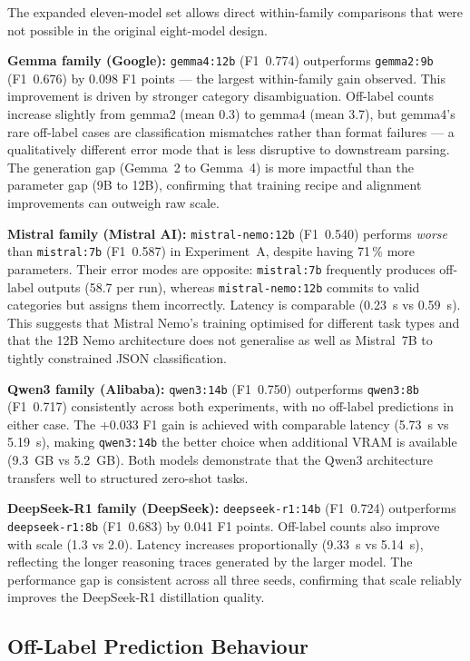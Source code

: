 \documentclass[journal]{IEEEtran}
\begin{document}
The expanded eleven-model set allows direct within-family comparisons
that were not possible in the original eight-model design.

\textbf{Gemma family (Google):} \texttt{gemma4:12b} (F1~0.774)
outperforms \texttt{gemma2:9b} (F1~0.676) by 0.098 F1 points —
the largest within-family gain observed. This improvement is driven by stronger category disambiguation.
Off-label counts increase slightly from gemma2 (mean 0.3) to
gemma4 (mean 3.7), but gemma4's rare off-label cases are
classification mismatches rather than format failures —
a qualitatively different error mode that is less disruptive
to downstream parsing. The generation gap (Gemma~2 to
Gemma~4) is more impactful than the parameter gap (9B to 12B),
confirming that training recipe and alignment improvements can
outweigh raw scale.

\textbf{Mistral family (Mistral AI):} \texttt{mistral-nemo:12b}
(F1~0.540) performs \emph{worse} than \texttt{mistral:7b} (F1~0.587)
in Experiment~A, despite having 71\,\% more parameters. Their
error modes are opposite: \texttt{mistral:7b} frequently produces
off-label outputs (58.7 per run), whereas \texttt{mistral-nemo:12b}
commits to valid categories but assigns them incorrectly.
Latency is comparable (0.23~s vs 0.59~s). This suggests that Mistral
Nemo's training optimised for different task types and that the
12B Nemo architecture does not generalise as well as Mistral~7B to
tightly constrained JSON classification.

\textbf{Qwen3 family (Alibaba):} \texttt{qwen3:14b} (F1~0.750)
outperforms \texttt{qwen3:8b} (F1~0.717) consistently across both
experiments, with no off-label predictions in either case. The
+0.033 F1 gain is achieved with comparable latency (5.73~s vs 5.19~s),
making \texttt{qwen3:14b} the better choice when additional VRAM is
available (9.3~GB vs 5.2~GB). Both models demonstrate that the Qwen3
architecture transfers well to structured zero-shot tasks.

\textbf{DeepSeek-R1 family (DeepSeek):} \texttt{deepseek-r1:14b}
(F1~0.724) outperforms \texttt{deepseek-r1:8b} (F1~0.683) by 0.041
F1 points. Off-label counts also improve with scale (1.3 vs 2.0).
Latency increases proportionally (9.33~s vs 5.14~s), reflecting
the longer reasoning traces generated by the larger model. The
performance gap is consistent across all three seeds, confirming
that scale reliably improves the DeepSeek-R1 distillation quality.

\subsection{Off-Label Prediction Behaviour}
\end{document}
